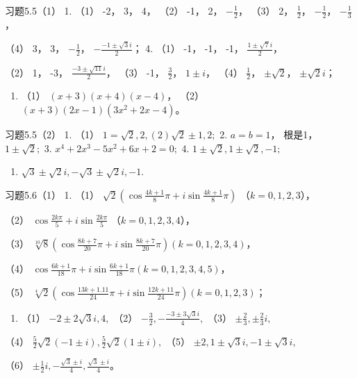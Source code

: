 习题5.5（1） 1. （1） -2， 3， 4， （2） -1， 2， \(-\frac{1}{2}\)，
（3） 2， \(\frac{1}{2}\)， \(-\frac{1}{2}\)， \(-\frac{1}{3}\)，

（4） 3， 3， \(-\frac{1}{2}\)， \(-\frac{-1\pm\sqrt{3}i}{2}\)； 4.
（1） -1， -1， -1， \(\frac{1\pm\sqrt{7}i}{2}\)，

（2） 1， -3， \(\frac{-3 \pm \sqrt{11}i}{2}\)， （3） -1，
\(\frac{3}{2}\)， \(1 \pm i\)， （4） \(\frac{1}{2}\)，
\(\pm \sqrt{2}\)， \(\pm \sqrt{2}i\)；

\begin{enumerate}[start=5]
\item
  （1） \((x + 3)(x + 4)(x - 4)\)， （2）
  \((x + 3)(2x - 1)(3x^2 + 2x - 4)\)。
\end{enumerate}

习题5.5（2） 1. （1） \(1 = \sqrt{2}, 2, (2)\sqrt{2} \pm 1, 2;\) 2.
\(a = b = 1\)， 根是1， \(1 \pm \sqrt{2};\) 3.
\(x^4 + 2x^3 - 5x^2 + 6x + 2 = 0;\) 4.
\(1 \pm \sqrt{2}, 1 \pm \sqrt{2}, -1;\)

\begin{enumerate}[start=5]
\item
  \(\sqrt{3} \pm \sqrt{2} i, -\sqrt{3} \pm \sqrt{2} i, -1.\)
\end{enumerate}

习题5.6（1） 1. （1）
\(\sqrt{2}\left(\cos \frac{4k + 1}{8}\pi + i\sin \frac{4k + 1}{8}\pi\right)\)
（\(k = 0, 1, 2, 3\)），

（2） \(\cos \frac{2k\pi}{5} + i\sin \frac{2k\pi}{5}\)
（\(k = 0, 1, 2, 3, 4\)），

（3）
\(\sqrt[10]{8}\left(\cos \frac{8k + 7}{20}\pi + i\sin \frac{8k + 7}{20}\pi\right) (k = 0, 1, 2, 3, 4)\)，

（4）
\(\cos \frac{6k + 1}{18}\pi + i\sin \frac{6k + 1}{18}\pi (k = 0, 1, 2, 3, 4, 5)\)，

（5）
\(\sqrt[4]{2}\left(\cos \frac{13k + 1.11}{24}\pi + i\sin \frac{12k + 11}{24}\pi\right) (k = 0, 1, 2, 3)\)；

\begin{enumerate}[start=2]
\item
  （1） \(-2 \pm 2\sqrt{3}i, 4,\) （2）
  \(-\frac{3}{2}, -\frac{-3 \pm 3\sqrt{3}i}{4},\) （3）
  \(\pm \frac{2}{3}, \pm \frac{2}{3}i,\)
\end{enumerate}

（4） \(\frac{5}{2}\sqrt{2} (-1\pm i),\frac{5}{2}\sqrt{2}(1\pm i),\)
（5） \(\pm 2,1\pm \sqrt{3} i, - 1\pm \sqrt{3} i,\)

（6）
\(\pm \frac{1}{2} i, -\frac{\sqrt{3} \pm i}{4}, \frac{\sqrt{3} \pm i}{4}\)。

